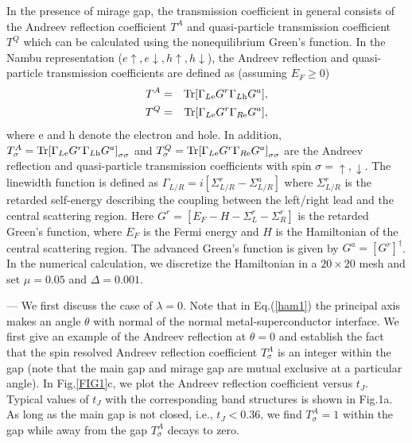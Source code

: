 \documentclass[aps, prb, twocolumn, amssymb, amsmath, showpacs, superscriptaddress]{revtex4-1}
\begin{document}
In the presence of mirage gap, the transmission coefficient in general consists of the Andreev reflection coefficient $T^A$ and quasi-particle transmission coefficient $T^Q$ which can be calculated using the nonequilibrium Green's function. In the Nambu representation ($e\uparrow ,e\downarrow ,h\uparrow ,h\downarrow $), the Andreev reflection and quasi-particle transmission coefficients are defined as (assuming $E_F \ge 0$)
\begin{eqnarray}
{{T}^{A}} &=&{\rm Tr}[ {{\Gamma }_{L\text{e}}}{{G}^{r}}{{\Gamma }_{L\text{h}}}{{G}^{a}}],\nonumber\\
{{T}^{Q}} &=&{\rm Tr}[ {{\Gamma }_{L\text{e}}}{{G}^{r}}{{\Gamma }_{R\text{e}}}{{G}^{a}}],\nonumber
\end{eqnarray}
where e and h denote the electron and hole. In addition,
$T_{\sigma}^{A}={\rm Tr}{[ {{\Gamma }_{L\text{e}}}{{G}^{r}}{{\Gamma }_{L\text{h}}}{{G}^{a}} ]}_{\sigma\sigma}$ and $T_{\sigma }^{Q}={\rm Tr}{{[{{\Gamma }_{L\text{e}}}{{G}^{r}}{{\Gamma }_{R\text{e}}}{{G}^{a}}]}_{\sigma\sigma}}$ are the Andreev reflection and quasi-particle transmission coefficients with spin $\sigma=\uparrow,\downarrow$\cite{note1}.
The linewidth function is defined as ${{\Gamma }_{L/R}}=i\left[ \Sigma _{L/R}^{r}-\Sigma _{L/R}^{a} \right]$ where
$\Sigma _{L/R}^{r}$ is the retarded self-energy describing the coupling between the left/right lead and the central scattering region. Here
${{G}^{r}}=[ E_F-{H}-\Sigma _{L}^{r}-\Sigma _{R}^{r} ]$ is the retarded Green's function, where $E_F$ is the Fermi energy and $H$ is the Hamiltonian of the central scattering region.
The advanced Green's function is given by ${{G}^{a}}={{\left[ {{G}^{r}} \right]}^{\dagger }}$.
In the numerical calculation, we discretize the Hamiltonian in a $20\times 20$ mesh and set $\mu=0.05$ and $\Delta=0.001$.

 --- We first discuss the case of $\lambda=0$. Note that in Eq.(\ref{ham1}) the principal axis makes an angle $\theta$ with normal of the normal metal-superconductor interface. We first give an example of the Andreev reflection at $\theta=0$ and establish the fact that the spin resolved Andreev reflection coefficient $T^A_\sigma$ is an integer within the gap (note that the main gap and mirage gap are mutual exclusive at a particular angle). In Fig.\ref{FIG1}c, we plot the Andreev reflection coefficient versus $t_J$. Typical values of $t_J$ with the corresponding band structures is shown in Fig.1a. As long as the main gap is not closed, i.e., $t_J < 0.36$, we find $T^A_\sigma=1$ within the gap while away from the gap $T^A_\sigma$ decays to zero.
\end{document}

